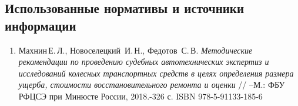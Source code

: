 
\subsection{Использованные нормативы и источники информации}
%
\begin{enumerate}
%	
%
%
%
%
%
%
\item 
Махнин\,Е.\,Л., Новоселецкий\, И.\,Н., Федотов\, С.\,В. \emph{Методические рекомендации по проведению судебных автотехнических экспертиз и исследований колесных транспортных средств в целях определения размера ущерба, стоимости восстановительного ремонта и оценки} // --М.: ФБУ РФЦСЭ при Минюсте России, 2018.-326 с.  ISBN 978-5-91133-185-6
%
%
%

\end{enumerate}
